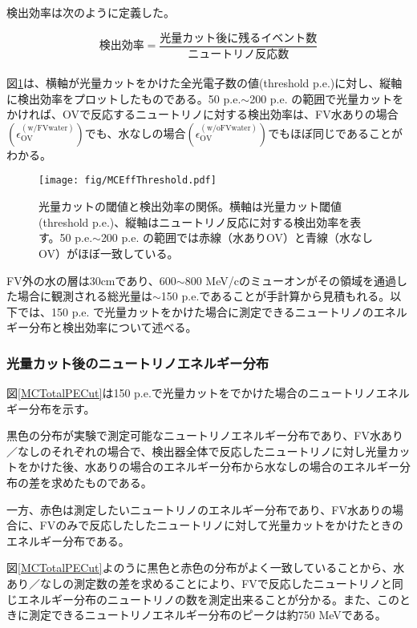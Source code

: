 \documentclass[11pt]{ltjsreport}
\newcommand{\figref}[1]{図\ref{#1}}
\newcommand{\ov}{\mathrm{OV}}
\newcommand{\ww}{\mathrm{(w/ FVwater)}}
\newcommand{\wow}{\mathrm{(w/o FVwater)}}
\begin{document}
検出効率は次のように定義した。

\begin{equation}
\text{検出効率} = \frac{\text{光量カット後に残るイベント数}}{\text{ニュートリノ反応数}}
\end{equation}
\mbox{}\\

\figref{MCEffThreshold}は、横軸が光量カットをかけた全光電子数の値(threshold p.e.)に対し、縦軸に検出効率をプロットしたものである。50 p.e.$\sim$200 p.e. の範囲で光量カットをかければ、OVで反応するニュートリノに対する検出効率は、FV水ありの場合$\left(\epsilon_{\ov}^{\ww}\right)$でも、水なしの場合$\left(\epsilon_{\ov}^{\wow}\right)$でもほぼ同じであることがわかる。

\begin{figure}[htbp]
\centering
\texttt{[image: fig/MCEffThreshold.pdf]}
\caption[光量カットの閾値と検出効率の関係]{光量カットの閾値と検出効率の関係。横軸は光量カット閾値(threshold p.e.)、縦軸はニュートリノ反応に対する検出効率を表す。50 p.e.$\sim$200 p.e. の範囲では赤線（水ありOV）と青線（水なしOV）がほぼ一致している。}
\label{MCEffThreshold}
\end{figure}


FV外の水の層は30cmであり、600$\sim$800 MeV/cのミューオンがその領域を通過した場合に観測される総光量は$\sim$150 p.e.であることが手計算から見積もれる。以下では、150 p.e. で光量カットをかけた場合に測定できるニュートリノのエネルギー分布と検出効率について述べる。

\subsubsection{光量カット後のニュートリノエネルギー分布}

\figref{MCTotalPECut}は150 p.e.で光量カットをでかけた場合のニュートリノエネルギー分布を示す。

黒色の分布が実験で測定可能なニュートリノエネルギー分布であり、FV水あり／なしのそれぞれの場合で、検出器全体で反応したニュートリノに対し光量カットをかけた後、水ありの場合のエネルギー分布から水なしの場合のエネルギー分布の差を求めたものである。

一方、赤色は測定したいニュートリノのエネルギー分布であり、FV水ありの場合に、FVのみで反応したしたニュートリノに対して光量カットをかけたときのエネルギー分布である。

\figref{MCTotalPECut}よのうに黒色と赤色の分布がよく一致していることから、水あり／なしの測定数の差を求めることにより、FVで反応したニュートリノと同じエネルギー分布のニュートリノの数を測定出来ることが分かる。また、このときに測定できるニュートリノエネルギー分布のピークは約750 MeVである。
\end{document}
